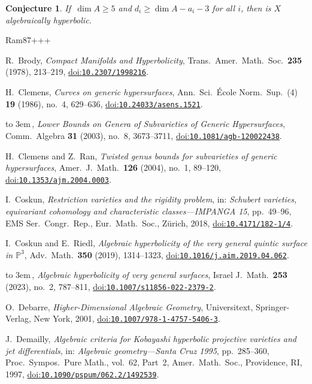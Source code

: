 \documentclass[10pt,a4paper]{article}
\numberwithin{equation}{section}
\newtheorem{conjecture}[theorem]{Conjecture}
\theoremstyle{definition}
\theoremstyle{remark}
\providecommand{\doi}[1]{\href{https://doi.org/#1}{doi:\nolinkurl{#1}}}
\providecommand{\bysame}{\leavevmode\hbox to 3em{\hrulefill}\,}
\begin{document}
\begin{conjecture}\label{dim_5_conjecture}
    If\, $\dim A\ge 5$ and $d_i\ge \dim A - a_i - 3$ for all $i$, then is $X$ algebraically hyperbolic.
\end{conjecture}

\begin{thebibliography}{Ram87+++}

R.~Brody, \emph{Compact Manifolds and Hyperbolicity}, Trans.\ Amer.\ Math.\ Soc.\ \textbf{235} (1978), 213--219, \doi{10.2307/1998216}.

H.~Clemens, \emph{Curves on generic hypersurfaces}, Ann.\ Sci.\ \'Ecole Norm.\
  Sup.~(4) \textbf{19} (1986), no.~4, 629--636, 
  \doi{10.24033/asens.1521}.

\bysame, \emph{Lower Bounds on Genera of Subvarieties of Generic
  Hypersurfaces}, Comm.\ Algebra \textbf{31} (2003), no.~8,
  3673--3711, \doi{10.1081/agb-120022438}.

H.~Clemens and Z.~Ran, \emph{Twisted genus bounds for subvarieties of generic
  hypersurfaces}, Amer.~J.\ Math.\ \textbf{126} (2004), no.~1,
  89--120, \doi{10.1353/ajm.2004.0003}.

  I.~Coskun, \emph{Restriction varieties and the rigidity problem}, in: \emph{Schubert varieties, equivariant cohomology and characteristic classes---IMPANGA 15}, pp.~49--96, EMS Ser.\ Congr.\ Rep., Eur.\ Math.\ Soc., Z\"urich, 2018, \doi{10.4171/182-1/4}.

I.~Coskun and E.~Riedl, \emph{Algebraic hyperbolicity of the very general
  quintic surface in $\mathbb{P}^3$}, Adv.\ Math.\ \textbf{350} (2019),
  1314--1323,
  \doi{10.1016/j.aim.2019.04.062}.

  \bysame, \emph{Algebraic hyperbolicity of very general surfaces}, Israel J.~Math.\  \textbf{253} (2023), no.~2, 787--811,
  \doi{10.1007/s11856-022-2379-2}.

O.~Debarre, \emph{Higher-Dimensional Algebraic Geometry}, Universitext,
  Springer-Verlag, New York, 2001, \doi{10.1007/978-1-4757-5406-3}.

J.~Demailly, \emph{Algebraic criteria for Kobayashi hyperbolic projective
  varieties and jet differentials}, in: \emph{Algebraic geometry---Santa Cruz 1995}, pp.~285--360, Proc.\ Sympos.\ Pure Math., vol.~62, Part~2, Amer.\ Math.\ Soc., Providence, RI, 1997, 
  \doi{10.1090/pspum/062.2/1492539}.


\end{thebibliography}
\end{document}
